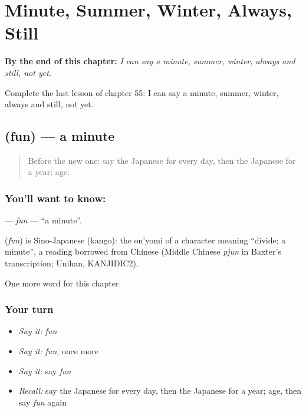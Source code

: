 
\chapter{Minute, Summer, Winter, Always, Still}
\label{ch:ja-minute-summer-winter-always-still}

\begin{chapteropening}
\textbf{By the end of this chapter:} \emph{I can say a minute, summer, winter, always and still, not yet.}

Complete the last lesson of chapter 55: I can say a minute, summer, winter, always and still, not yet.
\end{chapteropening}

\section[\texorpdfstring{\ja{ふん} (fun)}{ふん (fun)}]{ (fun) — a minute}

\label{lesson:JA-C55-fun}



\begin{quote}
Before the new one: say the Japanese for every day, then the Japanese for a year; age.
\end{quote}

\subsection*{You'll want to know: }
\textbf{} — \emph{fun} — \textquotedblleft{}a minute\textquotedblright{}.

\begin{cousinweb}
\textbf{} (\emph{fun}) is Sino-Japanese (kango): the on'yomi of a character meaning \textquotedblleft{}divide; a minute\textquotedblright{}, a reading borrowed from Chinese (Middle Chinese \emph{pjun} in Baxter's transcription; Unihan, KANJIDIC2).
\end{cousinweb}

\begin{grammarlens}[title={What you've built}]
One more word for this chapter.
\end{grammarlens}

\subsection*{Your turn}
\begin{itemize}
\raggedright
  \item \emph{Say it:} \emph{fun}
  \item \emph{Say it:} \emph{fun}, once more
  \item \emph{Say it:} say \emph{fun}
  \item \emph{Recall:} say the Japanese for every day, then the Japanese for a year; age, then say \emph{fun} again
\end{itemize}

